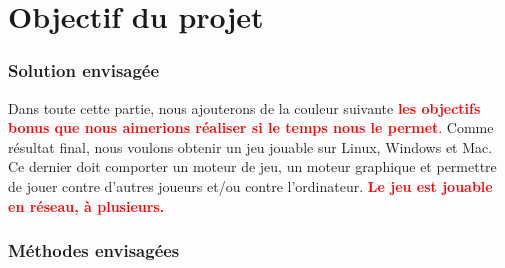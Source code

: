 \section{Objectif du projet}

  \subsubsection{Solution envisagée}
    Dans toute cette partie, nous ajouterons de la couleur suivante \textcolor{red}{\textbf{les objectifs bonus que nous aimerions réaliser si le temps nous le permet}}.
    Comme résultat final, nous voulons obtenir un jeu jouable sur Linux, Windows et Mac. Ce dernier doit comporter un moteur de jeu, un moteur graphique et permettre de jouer contre d'autres joueurs et/ou contre l'ordinateur.
    \textcolor{red}{\textbf{Le jeu est jouable en réseau, à plusieurs.}}
  \subsubsection{Méthodes envisagées}

